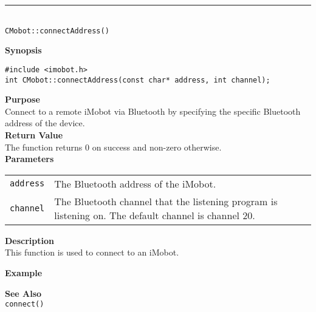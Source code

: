 \noindent
\vspace{5pt}
\rule{4.5in}{0.015in} \\
\noindent
{\LARGE \texttt{CMobot::connectAddress()}}\\
{}

\noindent
{\bf Synopsis}\\
\begin{verbatim}
#include <imobot.h>
int CMobot::connectAddress(const char* address, int channel);
\end{verbatim}

\noindent
{\bf Purpose}\\
Connect to a remote iMobot via Bluetooth by specifying the specific Bluetooth
address of the device.\\

\noindent
{\bf Return Value}\\
The function returns 0 on success and non-zero otherwise.\\

\noindent
{\bf Parameters}
\vspace{-0.1in}
\begin{description}
\item               
\begin{tabular}{p{10 mm}p{145 mm}}
\texttt{address} & The Bluetooth address of the iMobot. \\
\texttt{channel} & The Bluetooth channel that the listening program is
listening on. The default channel is channel 20. \\
\end{tabular}
\end{description}

\noindent
{\bf Description}\\
This function is used to connect to an iMobot. 

\noindent
{\bf Example}\\
\noindent

\noindent
{\bf See Also}\\
\texttt{connect()}

